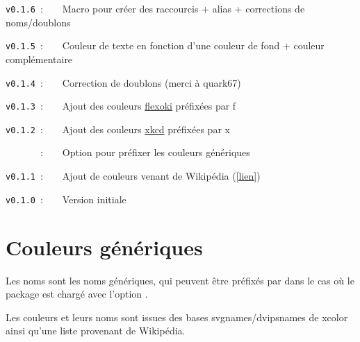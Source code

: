 \documentclass[french,11pt,a4paper]{article}
\begin{document}
\verb|v0.1.6|~:~~~~Macro pour créer des raccourcis + alias + corrections de noms/doublons

\verb|v0.1.5|~:~~~~Couleur de texte en fonction d'une couleur de fond + couleur complémentaire

\verb|v0.1.4|~:~~~~Correction de doublons (merci à \textsf{quark67})

\verb|v0.1.3|~:~~~~Ajout des couleurs \href{https://stephango.com/flexoki}{flexoki} préfixées par \textsf{f}

\verb|v0.1.2|~:~~~~Ajout des couleurs \href{https://xkcd.com/color/rgb.txt}{xkcd} préfixées par \textsf{x}

\verb|      |~:~~~~Option pour préfixer les couleurs génériques

\verb|v0.1.1|~:~~~~Ajout de couleurs venant de Wikipédia (\href{https://fr.wikipedia.org/wiki/Liste_de_noms_de_couleur}{[lien]})

\verb|v0.1.0|~:~~~~Version initiale

\pagebreak

\section{Couleurs génériques}

Les noms sont les noms génériques, qui peuvent être préfixés par  dans le cas où le package est chargé avec l'option \MontreCode{[Prefixe]}.

\smallskip

Les couleurs et leurs noms sont issues des bases \textsf{svgnames/dvipsnames} de \textsf{xcolor} ainsi qu'une liste provenant de \textsf{Wikipédia}.
%
\end{document}
